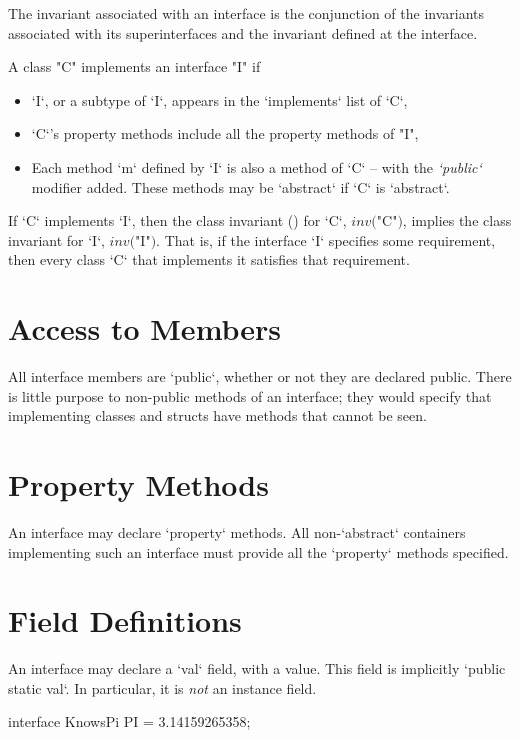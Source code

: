 \noindent
The invariant associated with an interface is the conjunction of the
invariants associated with its superinterfaces and the invariant
defined at the interface. 



A class \xcd"C"  implements an interface \xcd"I" if
\begin{itemize}
\item \xcd`I`, or a subtype of \xcd`I`, appears in the \xcd`implements` list
      of \xcd`C`, 
\item \xcd`C`'s property methods include all the property methods  of \xcd"I",
\item Each method \xcd`m` defined by \xcd`I` is also a method of \xcd`C` --
      with the {\em  \xcd`public`} modifier added.   These methods may be
      \xcd`abstract` if \xcd`C` is \xcd`abstract`.
\end{itemize}


If \xcd`C` implements \xcd`I`, then the class invariant
() for \xcd`C`,   $\mathit{inv}($\xcd"C"$)$, implies
the class invariant for \xcd`I`, $\mathit{inv}($\xcd"I"$)$.  That is, if the
interface \xcd`I` specifies some requirement, then every class \xcd`C` that
implements it satisfies that requirement.

\section{Access to Members}

All interface members are \xcd`public`, whether or not they are declared
public.  There is little purpose to non-public methods of an interface; they
would specify that implementing classes and structs have methods that cannot
be seen.

\section{Property Methods}

An interface may declare \xcd`property` methods.  All non-\xcd`abstract`
containers implementing such an interface must provide all the \xcd`property`
methods specified.  

\section{Field Definitions}

An interface may declare a \xcd`val` field, with a value.  This field is implicitly
\xcd`public static val`.  In particular, it is {\em not} an instance field. 
\begin{xten}
interface KnowsPi {
  PI = 3.14159265358;
}
\end{xten}
%

